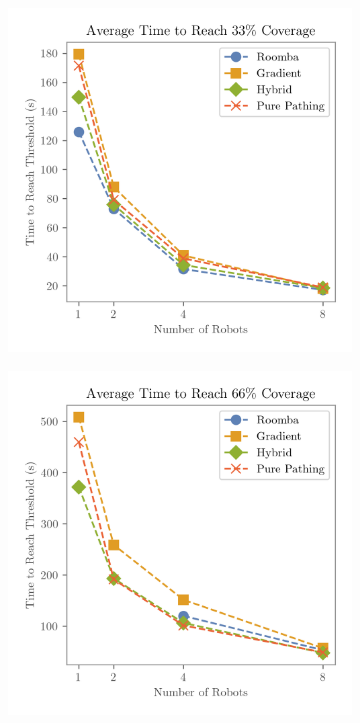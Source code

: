 \def\w{0.329\textwidth}
\begin{figure}[H]
    \centering
    \begin{subfigure}[b]{\w}
        \centering
        \includegraphics[width=\textwidth]{figures/plots/benchmarks/big-coverage-0.33-depot.png}
    \end{subfigure}
    \begin{subfigure}[b]{\w}
        \centering
        \includegraphics[width=\textwidth]{figures/plots/benchmarks/big-coverage-0.66-depot.png}

\end{subfigure}
\end{figure}
